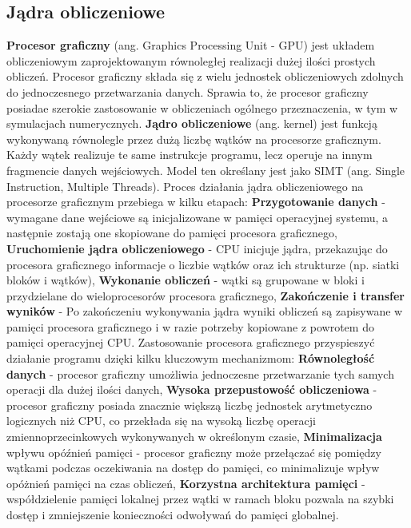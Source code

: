 \documentclass{article}
\begin{document}
\subsection{Jądra obliczeniowe}
\textbf{Procesor graficzny} (ang. Graphics Processing Unit - GPU) jest układem obliczeniowym zaprojektowanym równoległej realizacji dużej ilości prostych obliczeń. Procesor graficzny składa się z wielu jednostek obliczeniowych zdolnych do jednoczesnego przetwarzania danych. Sprawia to, że procesor graficzny posiadae szerokie zastosowanie w obliczeniach ogólnego przeznaczenia, w tym w symulacjach numerycznych.\newline\newline
\indent
\textbf{Jądro obliczeniowe} (ang. kernel) jest funkcją wykonywaną równolegle przez dużą liczbę wątków na procesorze graficznym. Każdy wątek realizuje te same instrukcje programu, lecz operuje na innym fragmencie danych wejściowych. Model ten określany jest jako SIMT (ang. Single Instruction, Multiple Threads).\newline\newline
\indent
Proces działania jądra obliczeniowego na procesorze graficznym przebiega w kilku etapach:\newline
\textbf{Przygotowanie danych} - wymagane dane wejściowe są inicjalizowane w pamięci operacyjnej systemu, a następnie zostają one skopiowane do pamięci procesora graficznego,\newline
\textbf{Uruchomienie jądra obliczeniowego} - CPU inicjuje jądra, przekazując do procesora graficznego informacje o liczbie wątków oraz ich strukturze (np. siatki bloków i wątków),\newline
\textbf{Wykonanie obliczeń} - wątki są grupowane w bloki i przydzielane do wieloprocesorów procesora graficznego,\newline
\textbf{Zakończenie i transfer wyników} - 
Po zakończeniu wykonywania jądra wyniki obliczeń są zapisywane w pamięci procesora graficznego i w razie potrzeby kopiowane z powrotem do pamięci operacyjnej CPU.\newline\newline
\indent
Zastosowanie procesora graficznego przyspieszyć działanie programu dzięki kilku kluczowym mechanizmom:\newline
\textbf{Równoległość danych} - procesor graficzny umożliwia jednoczesne przetwarzanie tych samych operacji dla dużej ilości danych,\newline
\textbf{Wysoka przepustowość obliczeniowa} - procesor graficzny posiada znacznie większą liczbę jednostek arytmetyczno logicznych niż CPU, co przekłada się na wysoką liczbę operacji zmiennoprzecinkowych wykonywanych w określonym czasie,\newline
\textbf{Minimalizacja} wpływu opóźnień pamięci - procesor graficzny może przełączać się pomiędzy wątkami podczas oczekiwania na dostęp do pamięci, co minimalizuje wpływ opóżnień pamięci na czas obliczeń,\newline
\textbf{Korzystna architektura pamięci} - współdzielenie pamięci lokalnej przez wątki w ramach bloku pozwala na szybki dostęp i zmniejszenie konieczności odwoływań do pamięci globalnej.\newline
\end{document}

